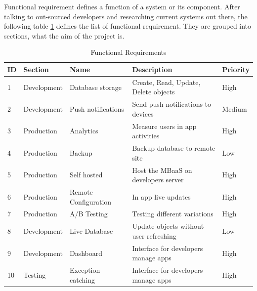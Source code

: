 Functional requirement defines a function of a system or its component. After talking to out-sourced developers and researching current systems out there, the following table \ref{tb:functional} defines the list of functional requirement. They are grouped into sections, what the aim of the project is. 

\begin{table}[h]
\centering
\caption{Functional Requirements}
\label{tb:functional}
\begin{tabular}{|l|l|l|l|l|}
\hline
\cellcolor{green!20}ID & \cellcolor{green!20}Section  & \cellcolor{green!20}Name  & \cellcolor{green!20}Description        & \cellcolor{green!20}Priority \\ \hline
1                      & Development                  & Database storage          & Create, Read, Update, Delete objects   & High   \\ \hline
2                      & Development                  & Push notifications        & Send push notifications to devices     & Medium \\ \hline
3                      & Production                   & Analytics                 & Measure users in app activities        & High   \\ \hline
4                      & Production                      & Backup                    & Backup database to remote site         & Low    \\ \hline
5                      & Production                      & Self hosted               & Host the MBaaS on developers server    & High   \\ \hline
6                      & Production                      & Remote Configuration      & In app live updates                    & High   \\ \hline
7                      & Production                      & A/B Testing               & Testing different variations           & High   \\ \hline
8                      & Development                  & Live Database             & Update objects without user refreshing & Low    \\ \hline
9                      & Development                  & Dashboard                & Interface for developers manage apps   & High   \\ \hline
10                     & Testing                      & Exception catching      & Interface for developers manage apps   & High   \\ \hline
\end{tabular}
\end{table}

